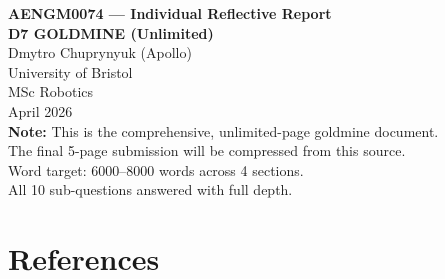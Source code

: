 \documentclass[11pt,a4paper]{article}
\begin{document}
\begin{titlepage}
\centering
\vspace*{3cm}
{\LARGE\bfseries AENGM0074 --- Individual Reflective Report\\[0.3em]
D7 GOLDMINE (Unlimited)}\\[2cm]
{\Large Dmytro Chuprynyuk (Apollo)}\\[1cm]
{\large University of Bristol\\
MSc Robotics\\[0.5em]
April 2026}\\[3cm]
{\normalsize
\textbf{Note:} This is the comprehensive, unlimited-page goldmine document.\\
The final 5-page submission will be compressed from this source.\\[1em]
Word target: 6000--8000 words across 4 sections.\\
All 10 sub-questions answered with full depth.}
\end{titlepage}






\section*{References}
\end{document}
